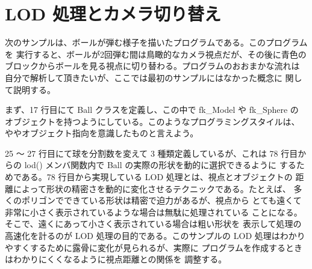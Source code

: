 \section{LOD 処理とカメラ切り替え}
次のサンプルは、ボールが弾む様子を描いたプログラムである。このプログラムを
実行すると、ボールが2回弾む間は鳥瞰的なカメラ視点だが、その後に青色の
ブロックからボールを見る視点に切り替わる。プログラムのおおまかな流れは
自分で解析して頂きたいが、ここでは最初のサンプルにはなかった概念に
関して説明する。

まず、17 行目にて Ball クラスを定義し、この中で fk\_Model や fk\_Sphere の
オブジェクトを持つようにしている。このようなプログラミングスタイルは、
ややオブジェクト指向を意識したものと言えよう。

25 〜 27 行目にて球を分割数を変えて 3 種類定義しているが、これは
78 行目からの lod() メンバ関数内で Ball の実際の形状を動的に選択できるように
するためである。78 行目から実現している LOD 処理とは、視点とオブジェクトの
距離によって形状の精密さを動的に変化させるテクニックである。たとえば、
多くのポリゴンでできている形状は精密で迫力があるが、視点から
とても遠くて非常に小さく表示されているような場合は無駄に処理されている
ことになる。そこで、遠くにあって小さく表示されている場合は粗い形状を
表示して処理の高速化を計るのが LOD 処理の目的である。このサンプルの
LOD 処理はわかりやすくするために露骨に変化が見られるが、実際に
プログラムを作成するときはわかりにくくなるように視点距離との関係を
調整する。
\\
